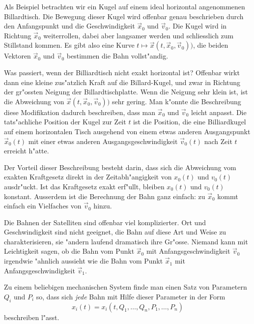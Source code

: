 \begin{beispiel}
Als Beispiel betrachten wir ein Kugel auf einem ideal horizontal angenommenen
Billardtisch. Die Bewegung dieser Kugel wird offenbar genau beschrieben
durch den Anfangspunkt und die Geschwindigkeit $\vec x_0$ und $\vec v_0$.
Die Kugel wird in Richtung $\vec x_0$ weiterrollen, dabei
aber langsamer werden und schliesslich zum Stillstand kommen.
Es gibt also eine Kurve $t\mapsto \vec x(t, \vec x_0, \vec v_0))$,
die beiden Vektoren $\vec x_0$ und $\vec v_0$ bestimmen die
Bahn vollst"andig.

Was passiert, wenn der Billiardtisch nicht exakt horizontal ist?
Offenbar wirkt dann eine kleine zus"atzlich Kraft auf die Billard-Kugel,
und zwar in Richtung der gr"ossten Neigung der Billardtischplatte.
Wenn die Neigung sehr klein ist, ist die Abweichung von 
$\vec x(t,\vec x_0,\vec v_0))$ sehr gering.
Man k"onnte die Beschreibung diese Modifikation dadurch beschreiben,
dass man $\vec x_0$ und $\vec v_0$ leicht anpasst.
Die tats"achliche Position der Kugel zur Zeit $t$ ist die Position,
die eine Billiardkugel auf einem horizontalen Tisch ausgehend von
einem etwas anderen Ausgangspunkt $\vec x_0(t)$ mit einer
etwas anderen Ausgangsgeschwindigkeit $\vec v_0(t)$
nach Zeit $t$ erreicht h"atte.
\end{beispiel}

Der Vorteil dieser Beschreibung besteht darin, dass sich die
Abweichung vom exakten Kraftgesetz direkt in der Zeitabh"angigkeit
von $x_0(t)$ und $v_0(t)$ ausdr"uckt. Ist das Kraftgesetz exakt
erf"ullt, bleiben $x_0(t)$ und $v_0(t)$ konstant. Ausserdem ist die
Berechnung der Bahn ganz einfach: zu $\vec x_0$ kommt einfach
ein Vielfaches von $\vec v_0$ hinzu.

Die Bahnen der Satelliten sind offenbar viel komplizierter. 
Ort und Geschwindigkeit sind nicht geeignet, die
Bahn auf diese Art und Weise zu charakterisieren, sie "andern laufend
dramatisch ihre Gr"osse. Niemand kann mit Leichtigkeit sagen, ob
die Bahn vom Punkt  $\vec x_0$ mit Anfangsgeschwindigkeit $\vec v_0$
irgendwie "ahnlich aussieht wie die Bahn vom Punkt $\vec x_1$
mit Anfangsgeschwindigkeit $\vec v_1$.

\begin{aufgabe}
\label{jacobi:aufgabe}
Zu einem beliebigen mechanischen System finde man einen Satz von 
Parametern 
$Q_i$ und $P_i$ so, dass sich {\em jede}
Bahn mit Hilfe dieser Parameter in der Form
\begin{equation}
x_i(t) = x_i(t,Q_1,\dots,Q_n,P_1,\dots,P_n)
\label{jacobi:aufgabekurve}
\end{equation}
beschreiben l"asst.
\end{aufgabe}

